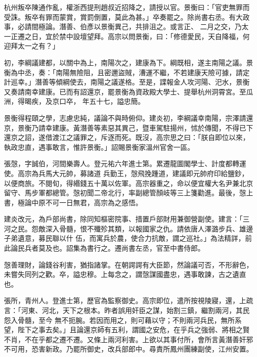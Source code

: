 \begin{pinyinscope}
 杭州叛卒陳通作亂，權浙西提刑趙叔近招降之，請授以官。景衡曰：「官吏無罪而受誅。叛卒有罪而蒙賞，賞罰倒置，莫此為甚。」卒奏罷之。除尚書右丞。有大政事，必請間極論。潛善、伯彥以景衡異己，共排沮之。或言正、
 二月之交，乃太一正遷之日，宜於禁中設壇望拜。高宗以問景衡，曰：「修德愛民，天自降福，何迎拜太一之有？」



 初，李綱議建都，以關中為上，南陽次之，建康為下。綱既相，遂主南陽之議。景衡為中丞，奏：「南陽無險阻，且密邇盜賊，漕運不繼，不若建康天險可據，請定計巡幸。」潛善等傾綱使去，南陽之議遂格。至是，諜報金人攻河陽、汜水，景衡又奏請南幸建康。已而有詔還京，罷景衡為資政殿大學士、提舉杭州洞霄宮。至瓜洲，得暍疾，及京口卒，
 年五十七，謚忠簡。



 景衡得程頤之學，志慮忠純，議論不與時俯仰。建炎初，李綱議幸南陽，宗澤請還京，景衡乃請幸建康。黃潛善等素惡其異己，暨車駕駐揚州，怵於傳聞，不得已下還京之詔，遂借渡江之議罪之，斥逐而死。既沒，高宗思之曰：「朕自即位以來，執政忠直，遇事敢言，惟許景衡。」詔賜景衡家溫州官舍一區。



 張愨，字誠伯，河間樂壽人。登元祐六年進士第。累遷龍圖閣學士、計度都轉運使。高宗為兵馬大元帥，募諸道
 兵勤王，愨飛挽踵道，建議即元帥府印給鹽鈔，以便商旅。不閱旬，得緡錢五十萬以佐軍。高宗器重之，命以便宜權大名尹兼北京留守、馬步軍都總管。愨初聞二帝北行，率副總管顏岐等三上箋勸進。最後，愨上書，極論中原不可一日無君，高宗為之感悟。



 建炎改元，為戶部尚書，除同知樞密院事、措置戶部財用兼御營副使。建言：「三河之民。怨敵深入骨髓，恨不殲殄其類，以報國家之仇。請依唐人澤潞步兵、雄邊子弟遺意，募民聯以什
 伍，而寓兵於農，使合力抗敵，謂之巡社。」為法精詳，前此論民兵者莫及也。詔集為書行之。遷尚書左丞，官至中書侍郎。



 愨善理財，論錢谷利害，猶指諸掌。在朝諤諤有大臣節，然論議可否，不形辭色，未嘗失同列之歡。卒，謚忠穆。上每念之，謂愨謀國盡忠，遇事敢諫，古之遺直也。



 張所，青州人。登進士第，歷官為監察御史。高宗即位，遣所按視陵寢，還，上疏言：「河東、河北，天下之根本。昨者誤用奸臣之謀，始割三鎮，繼割兩河，其民怨入骨髓，至今
 無不扼腕。若因而用之，則可藉以守；不則兩河兵民，無所系望，陛下之事去矣。」且論還京師有五利，謂國之安危，在乎兵之強弱、將相之賢不肖，不在乎都之遷不遷。又條上兩河利害。上欲以其事付所，會所言黃潛善奸邪不可用，恐害新政。乃罷所御史，改兵部郎中。尋責所鳳州團練副使，江州安置。




\end{pinyinscope}
